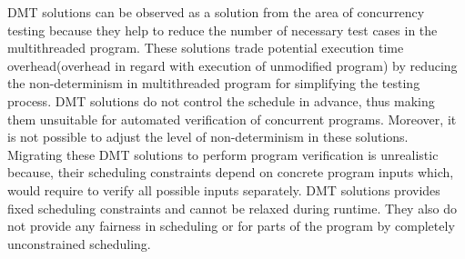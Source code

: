 DMT solutions can be observed as a solution from the area of concurrency testing because they help to reduce the number of necessary test cases in the multithreaded program. 
These solutions trade potential execution time overhead(overhead in regard with execution of unmodified program) by reducing the non-determinism in multithreaded program for simplifying the testing process. 
DMT solutions do not control the schedule in advance, thus making them unsuitable for automated verification of concurrent programs. 
Moreover, it is not possible to adjust the level of non-determinism in these solutions. 
Migrating these DMT solutions to perform program verification is unrealistic because, their scheduling constraints depend on concrete program inputs which, would require to verify all possible inputs separately. 
DMT solutions provides fixed scheduling constraints and cannot be relaxed during runtime\citep{metzler2017quick}. 
They also do not provide any fairness in scheduling or for parts of the program by completely unconstrained scheduling. 



